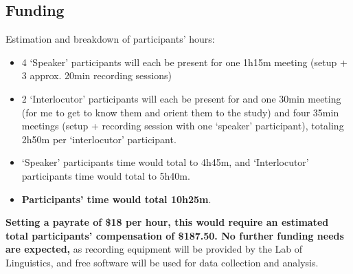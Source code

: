 \documentclass[11pt]{article}
\begin{document}
\subsection{Funding}
Estimation and breakdown of participants' hours:
\begin{itemize}
\item 4 `Speaker' participants will each be present for one 1h15m meeting (setup + 3 approx. 20min recording sessions)

\item 2 `Interlocutor' participants will each be present for and one 30min meeting (for me to get to know them and orient them to the study) and four 35min meetings (setup + recording session with one `speaker' participant), totaling 2h50m per `interlocutor' participant. 

\item `Speaker' participants time would total to 4h45m, and `Interlocutor' participants time would total to 5h40m. 

\item \textbf{Participants' time would total 10h25m}.

\end{itemize}
\textbf{Setting a payrate of \$18 per hour, this would require an estimated total participants' compensation of \$187.50.  No further funding needs are expected,} as recording equipment will be provided by the Lab of Linguistics, and free software will be used for data collection and analysis.

\printbibliography[title=References with Annotations]
\end{document}

